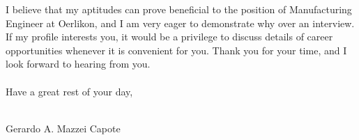 \documentclass[12pt,letterpaper]{article}
\begin{document}
I believe that my aptitudes can prove beneficial to the position of Manufacturing Engineer at Oerlikon, and I am very eager to demonstrate why over an interview. If my profile interests you, it would be a privilege to discuss details of career opportunities whenever it is convenient for you. Thank you for your time, and I look forward to hearing from you.
\\
\\
Have a great rest of your day,
\\
\\
\begin{center}
Gerardo A. Mazzei Capote
\end{center}
\end{document}
